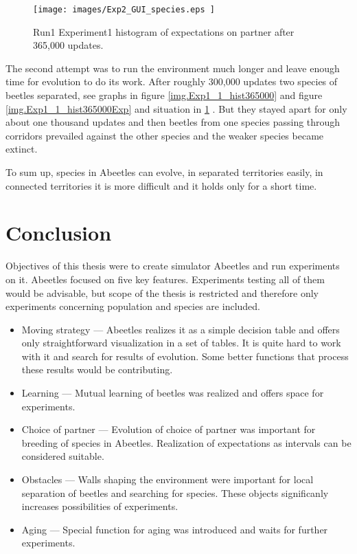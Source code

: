 \documentclass[a4paper,12pt]{report}
\begin{document}
\begin{figure}
\begin{center}
  \texttt{[image: images/Exp2\_GUI\_species.eps ]}
  \caption{Run1 Experiment1 histogram of expectations on partner after 365,000 updates.}
  \label{img.Exp2_GUI_species.eps}
\end{center}
\end{figure}
  
The second attempt was to run the environment much longer and leave enough time for evolution to do its work. After roughly 300,000 updates two species of beetles separated, see graphs in figure \ref{img.Exp1_1_hist365000} and figure \ref{img.Exp1_1_hist365000Exp} and situation in \ref{img.Exp2_GUI_species.eps} . But they stayed apart for only about one thousand updates and then beetles from one species passing through corridors prevailed against the other species and the weaker species became extinct. 

To sum up, species in Abeetles can evolve, in separated territories easily, in connected territories it is more difficult and it holds only for a short time.



\chapter{Conclusion}

Objectives of this thesis were to create simulator Abeetles and run experiments on it. Abeetles focused on five key features. Experiments testing all of them  would be advisable, but scope of the thesis is restricted and therefore only experiments concerning population and species are included.
  
\begin {itemize}
\item Moving strategy --- Abeetles realizes it as a simple decision table and offers only straightforward visualization in a set of tables. It is quite hard to work with it and search for results of evolution. Some better functions that process these results would be contributing. 
\item Learning --- Mutual learning of beetles was realized and offers space for experiments.
\item Choice of partner --- Evolution of choice of partner was important for breeding of species in Abeetles. Realization of expectations as intervals can be considered suitable.
\item Obstacles --- Walls shaping the environment were important for local separation of beetles and searching for species. These objects significanly increases possibilities of experiments.
\item Aging --- Special function for aging was introduced and waits for further experiments. 
\end{itemize}
\end{document}
